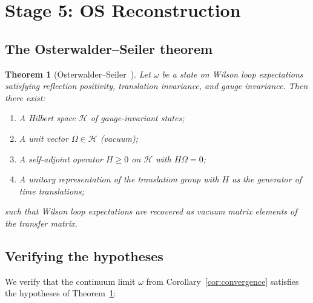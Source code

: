 \documentclass[11pt,a4paper]{article}
\theoremstyle{plain}
\newtheorem{theorem}{Theorem}[section]
\theoremstyle{definition}
\theoremstyle{remark}
\newcommand{\cH}{\mathcal{H}}
\begin{document}
\section{Stage 5: OS Reconstruction}\label{sec:os}

\subsection{The Osterwalder--Seiler theorem}

\begin{theorem}[Osterwalder--Seiler~\cite{OS78}]
\label{thm:os}
Let $\omega$ be a state on Wilson loop expectations
satisfying reflection positivity, translation invariance,
and gauge invariance. Then there exist:
\begin{enumerate}[label=(\alph*),nosep]
  \item A Hilbert space $\cH$ of gauge-invariant states;
  \item A unit vector $\Omega \in \cH$ (vacuum);
  \item A self-adjoint operator $H \ge 0$ on $\cH$
    with $H\Omega = 0$;
  \item A unitary representation of the translation group
    with $H$ as the generator of time translations;
\end{enumerate}
such that Wilson loop expectations are recovered
as vacuum matrix elements of the transfer matrix.
\end{theorem}

\subsection{Verifying the hypotheses}

We verify that the continuum limit $\omega$ from
Corollary~\ref{cor:convergence} satisfies the hypotheses
of Theorem~\ref{thm:os}:
\end{document}
